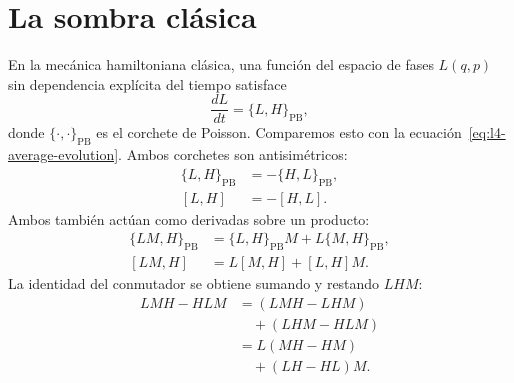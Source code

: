 \begin{classroomqa}
\end{classroomqa}

\begin{classroomqa}
\end{classroomqa}

\section{La sombra clásica}

En la mecánica hamiltoniana clásica, una función del espacio de fases \(L(q,p)\) sin dependencia explícita del tiempo satisface
\begin{equation}
\frac{dL}{dt}=\{L,H\}_{\mathrm{PB}},
\label{eq:l4-poisson-evolution}
\end{equation}
donde \(\{\cdot,\cdot\}_{\mathrm{PB}}\) es el corchete de Poisson. Comparemos esto con la ecuación~\eqref{eq:l4-average-evolution}. Ambos corchetes son antisimétricos:
\begin{align}
\{L,H\}_{\mathrm{PB}}&=-\{H,L\}_{\mathrm{PB}},\\
[L,H]&=-[H,L].
\end{align}
Ambos también actúan como derivadas sobre un producto:
\begin{align}
\{LM,H\}_{\mathrm{PB}}
&=\{L,H\}_{\mathrm{PB}}M+L\{M,H\}_{\mathrm{PB}},\\
[LM,H]
&=L[M,H]+[L,H]M.
\label{eq:l4-commutator-product}
\end{align}
La identidad del conmutador se obtiene sumando y restando \(LHM\):
\begin{align}
LMH-HLM
&=(LMH-LHM)\\
&\quad +(LHM-HLM)\\
&=L(MH-HM)\\
&\quad +(LH-HL)M.
\end{align}


